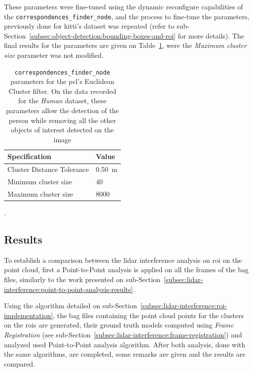 These parameters were fine-tuned using the dynamic reconfigure capabilities of the \texttt{correspondences\_finder\_node}, and the process to fine-tune the parameters, previously done for \ac{kitti}'s dataset was repeated (refer to sub-Section~\ref{subsec:object-detection:bounding-boxes-and-roi} for more details). The final results for the parameters are given on Table~\ref{tab:experimental-euclidian-cluster-specs}, were the \textit{Maximum cluster size} parameter was not modified.


\begin{table}[!ht]
	\centering
	\renewcommand{\arraystretch}{1.2}
	\begin{tabular}{@{}p{6cm}l@{}}
	 \toprule
	 Specification & Value \\
	 \midrule
	 Cluster Distance Tolerance & \SI{0.50}{\meter} \\
	 Minimum cluster size & $40$ \\
	 Maximum cluster size & $8000$ \\
	 \bottomrule
	\end{tabular}
	\caption[Euclidian cluster parameters to select only the \ac{roi} containing the person on the \textit{Human} dataset.] {\texttt{correspondences\_finder\_node} parameters for the \ac{pcl}'s Euclidean Cluster filter. On the data recorded for the \textit{Human} dataset, these parameters allow the detection of the person while removing all the other objects of interest detected on the image}.
	\label{tab:experimental-euclidian-cluster-specs}
\end{table}

\subsection{Results}
To establish a comparison between the \ac{lidar} interference analysis on \ac{roi} on the point cloud, first a Point-to-Point analysis is applied on all the frames of the bag files, similarly to the work presented on sub-Section~\ref{subsec:lidar-interference:point-to-point-analysis-results}.

Using the algorithm detailed on sub-Section~\ref{subsec:lidar-interference:roi-implementation}, the bag files containing the point cloud points for the clusters on the \acp{roi} are generated, their ground truth models computed using \textit{Frame Registration} (see sub-Section~\ref{subsec:lidar-interference:frame-registration}) and analyzed used Point-to-Point analysis algorithm. After both analysis, done with the same algorithms, are completed, some remarks are given and the results are compared.

